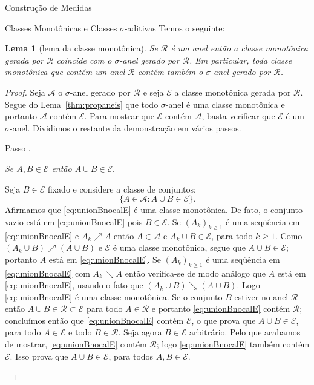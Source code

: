 \documentclass[oneside,final,11pt]{amsbook}
\newcounter{contastep}
\newenvironment{stepindent}{\setcounter{contastep}{1}
\begin{list} {Passo \arabic{contastep}.}
{\usecounter{contastep}
\setlength{\leftmargin}{10pt}
\setlength{\rightmargin}{10pt}
\setlength{\labelsep}{5pt}
\setlength{\itemsep}{10pt}
\setlength{\topsep}{10pt}}}
{\end{list}}
\theoremstyle{remark}\newtheorem{exercise}{Exercício}[chapter]
\theoremstyle{remark}\newtheorem{*exercise}[exercise]{\hbox to 0pt{\hskip 0pt minus 1fil*}Exercício}
\theoremstyle{definition}\newtheorem{exdefin}{Definição}[chapter]
\theoremstyle{plain}\newtheorem{teo}{Teorema}[section]
\theoremstyle{plain}\newtheorem{lem}[teo]{Lema}
\theoremstyle{plain}\newtheorem{prop}[teo]{Proposição}
\theoremstyle{plain}\newtheorem{cor}[teo]{Corolário}
\theoremstyle{definition}\newtheorem{defin}[teo]{Definição}
\theoremstyle{remark}\newtheorem{rem}[teo]{Observação}
\theoremstyle{definition}\newtheorem{notation}[teo]{Notação}
\theoremstyle{definition}\newtheorem{convention}[teo]{Convenção}
\theoremstyle{definition}\newtheorem{example}[teo]{Exemplo}
\numberwithin{section}{chapter}
\numberwithin{equation}{section}
\begin{document}
\begin{chapter}{Construção de Medidas}
\begin{section}{Classes Monotônicas e Classes ${\sigma}$-aditivas}
Temos o seguinte:
\begin{lem}[lema da classe monotônica]
\label{thm:lemmonclass}
Se $\mathcal R$ é um anel então a classe monotônica gerada por $\mathcal R$ coincide com o $\sigma$-anel
gerado por $\mathcal R$. Em particular, toda classe monotônica que contém um anel $\mathcal R$ contém
também o $\sigma$-anel gerado por $\mathcal R$.
\end{lem}
\begin{proof}
Seja $\mathcal A$ o $\sigma$-anel gerado por $\mathcal R$ e seja $\mathcal E$ a classe monotônica gerada
por $\mathcal R$. Segue do Lema~\ref{thm:propaneis} que todo $\sigma$-anel é uma classe monotônica e portanto
$\mathcal A$ contém $\mathcal E$. Para mostrar que $\mathcal E$ contém $\mathcal A$, basta verificar que
$\mathcal E$ é um $\sigma$-anel. Dividimos o restante da demonstração em vários passos.

\begin{stepindent}
\item\label{itm:monotclass1}
{\em Se $A,B\in\mathcal E$ então $A\cup B\in\mathcal E$}.

Seja $B\in\mathcal E$ fixado e considere a classe de conjuntos:
\begin{equation}\label{eq:unionBnocalE}
\big\{A\in\mathcal A:A\cup B\in\mathcal E\big\}.
\end{equation}
Afirmamos que \eqref{eq:unionBnocalE} é uma classe monotônica. De fato, o conjunto vazio está em \eqref{eq:unionBnocalE}
pois $B\in\mathcal E$. Se $(A_k)_{k\ge1}$ é uma seqüência em \eqref{eq:unionBnocalE} e $A_k\nearrow A$ então
$A\in\mathcal A$ e $A_k\cup B\in\mathcal E$, para todo $k\ge1$. Como $(A_k\cup B)\nearrow(A\cup B)$ e
$\mathcal E$ é uma classe monotônica, segue que $A\cup B\in\mathcal E$; portanto $A$ está em \eqref{eq:unionBnocalE}.
Se $(A_k)_{k\ge1}$ é uma seqüência em \eqref{eq:unionBnocalE} com $A_k\searrow A$ então verifica-se de modo análogo
que $A$ está em \eqref{eq:unionBnocalE}, usando o fato que $(A_k\cup B)\searrow(A\cup B)$. Logo \eqref{eq:unionBnocalE}
é uma classe monotônica. Se o conjunto $B$ estiver no anel $\mathcal R$ então $A\cup B\in\mathcal R\subset\mathcal E$
para todo $A\in\mathcal R$ e portanto \eqref{eq:unionBnocalE} contém $\mathcal R$; concluímos então que \eqref{eq:unionBnocalE}
contém $\mathcal E$, o que prova que $A\cup B\in\mathcal E$, para todo $A\in\mathcal E$ e todo $B\in\mathcal R$.
Seja agora $B\in\mathcal E$ arbitrário. Pelo que acabamos de mostrar, \eqref{eq:unionBnocalE} contém $\mathcal R$; logo
\eqref{eq:unionBnocalE} também contém $\mathcal E$. Isso prova que $A\cup B\in\mathcal E$, para todos $A,B\in\mathcal E$.


\end{stepindent}
\end{proof}
\end{section}
\end{chapter}
\end{document}
